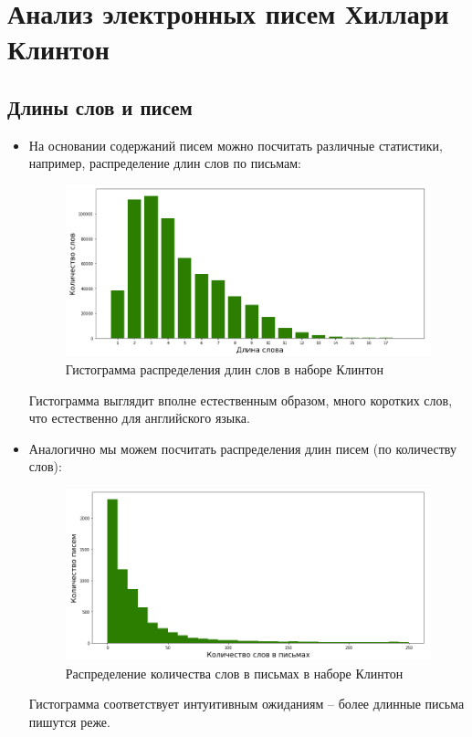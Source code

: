 \section{Анализ электронных писем Хиллари Клинтон}

\subsection{Длины слов и писем}

\begin{itemize}

\item На основании содержаний писем можно посчитать различные статистики, например,
распределение длин слов по письмам: 

\begin{figure}[H]
\centering
\includegraphics[scale=0.5]{pics/word_lengths.png}
\caption{Гистограмма распределения длин слов в наборе Клинтон}
\end{figure}


Гистограмма выглядит вполне естественным образом, много коротких слов, что естественно для английского языка.

\item Аналогично мы можем посчитать распределения длин писем (по количеству слов):

\begin{figure}[H]
\centering
\includegraphics[scale=0.5]{pics/email_lengths.png}
\caption{Распределение количества слов в письмах в наборе Клинтон}
\end{figure}

Гистограмма соответствует интуитивным ожиданиям -- более длинные письма пишутся реже. 
\end{itemize}

